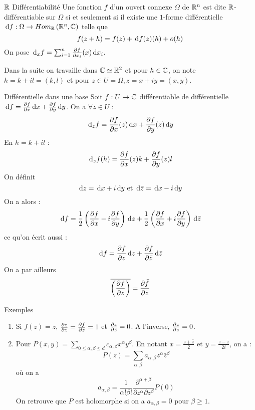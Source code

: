 \documentclass{cours}
\begin{document}
\begin{définition}{$\mathbb{R}$ Différentiabilité}{}
	Une fonction $f$ d'un ouvert connexe $\Omega$ de $\mathbb{R}^{n}$ est dite $\mathbb{R}$-différentiable sur $ \Omega$ si et seulement si il existe une $1$-forme différentielle ${\rm \, d} f : \Omega \to Hom_{\mathbb{R}}\left(\mathbb{R}^{n}, \mathbb{C}\right)$ telle que 
	\[
		f(z + h) = f(z) + {\rm \, d} f(z)(h) + o(h)
	\]
	On pose ${\rm \, d}_{x}f = \sum_{i = 1}^{n}\frac{\partial f}{\partial x_{i}}(x){\rm \, d} x_{i}$.
\end{définition}

Dans la suite on travaille dans $\mathbb{C} \simeq \mathbb{R}^{2}$ et pour $h \in \mathbb{C}$, on note $h = k + il = (k, l)$ et pour $z \in U = \Omega, z = x+ iy = (x, y)$.

\begin{propositionfr}{Différentielle dans une base}{}
	Soit $f : U \to \mathbb{C}$ différentiable de différentielle ${\rm \, d} f = \frac{\partial f}{\partial x}{\rm \, d} x + \frac{\partial f}{\partial y} {\rm \, d} y$. On a $\forall z \in U$ : 
	\[	
		{\rm \, d}_{z}f = \frac{\partial f}{\partial x}(z){\rm \, d} x + \frac{\partial f}{\partial y}(z) {\rm \, d} y
	\]
	En $h = k + il$ : 
	\[
		{\rm \, d}_{z}f(h) = \frac{\partial f}{\partial x}(z)k + \frac{\partial f}{\partial y}(z)l
	\]
	On définit 
	\[
		{\rm \, d} z = {\rm \, d} x + i{\rm \, d} y \text{ et } {\rm \, d}\bar{z} = {\rm \, d} x - i{\rm \, d} y
	\]
	On a alors : 
	\[	
		{\rm \, d} f = \frac{1}{2}\left(\frac{\partial f}{\partial x} - i\frac{\partial f}{\partial y}\right){\rm \, d} z + \frac{1}{2}\left(\frac{\partial f}{\partial x} + i\frac{\partial f}{\partial y}\right){\rm \, d}\bar{z}
	\]
	ce qu'on écrit aussi : 
	\[	
		{\rm \, d} f = \frac{\partial f}{\partial z}{\rm \, d} z + \frac{\partial f}{\partial \bar{z}}{\rm \, d}\bar{z}
	\]
	On a par ailleurs 
	\[
		\overline{\left(\frac{\partial f}{\partial z}\right)} = \frac{\partial \bar{f}}{\partial \bar{z}}
	\]
\end{propositionfr}

\begin{propositionfr}{Exemples}{}
	\begin{enumerate}
		\item Si $f(z) = z$, $\frac{\partial z}{\partial z} = \frac{\partial f}{\partial z} = 1$ et $\frac{\partial z}{\partial \bar{z}} = 0$. A l'inverse, $\frac{\partial \bar{z}}{\partial z} = 0$.
		\item Pour $P(x, y) = \sum_{0 \leq \alpha, \beta\leq d}c_{\alpha, \beta}x^{\alpha}y^{\beta}$. En notant $x = \frac{z + \bar{z}}{2}$ et $y = \frac{z - \bar{z}}{2i}$, on a : 
			\[
				P(z) = \sum_{\alpha, \beta}a_{\alpha, \beta}z^{\alpha}\bar{z}^{\beta}
			\]
			où on a 
			\[	
				a_{\alpha, \beta} = \frac{1}{\alpha!\beta!}\frac{\partial^{\alpha + \beta}}{\partial z^{\alpha}\partial z^{\beta}}P(0)
			\]
			On retrouve que $P$ est holomorphe si on a $a_{\alpha, \beta} = 0$ pour $\beta \geq 1$. 
	\end{enumerate}
\end{propositionfr}
\end{document}
